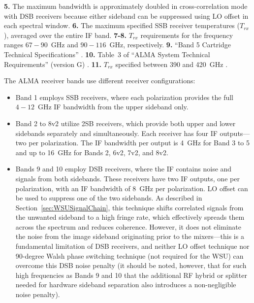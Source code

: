 \begin{table}[h!]
\begin{minipage}{\textwidth}
        \textbf{5.} The maximum bandwidth is approximately doubled in cross-correlation mode with DSB receivers because either sideband can be suppressed using LO offset in each spectral window. 
        \textbf{6.} The maximum specified \ac{SSB} receiver temperatures ($T_{rx}$), averaged over the entire IF band.
        \textbf{7-8.} $T_{rx}$ requirements for the frequency ranges $67-90$~GHz and $90-116$~GHz, respectively.
        \textbf{9.} ``Band 5 Cartridge Technical Specifications'' \cite{band5_spe}.
        \textbf{10.} Table~3 of ``ALMA System Technical Requirements'' (version G) \cite{sys_reqs}.
        \textbf{11.} $T_{rx}$ specified between 390 and 420~GHz \cite{sys_reqs}.
    \end{minipage}
\end{table}

The \ac{ALMA} receiver bands use different receiver configurations:
\begin{itemize}[itemsep=-0.5em]
    \item Band 1 employs \ac{SSB} receivers, where each polarization provides the full $4-12$~GHz IF bandwidth from the upper sideband only.
    \item Band 2 to 8v2 utilize \ac{2SB} receivers, which provide both upper and lower sidebands separately and simultaneously. Each receiver has four IF outputs—two per polarization. The \ac{IF} bandwidth per output is 4~GHz for Band 3 to 5 and up to 16~GHz for Bands 2, 6v2, 7v2, and 8v2.
    \item Bands 9 and 10 employ \ac{DSB} receivers, where the \ac{IF} contains noise and signals from both sidebands. These receivers have two \ac{IF} outputs, one per polarization, with an \ac{IF} bandwidth of 8~GHz per polarization. \ac{LO} offset can be used to suppress one of the two sidebands. As described in Section~\ref{sec:WSUSignalChain}, this technique shifts correlated signals from the unwanted sideband to a high fringe rate, which effectively spreads them across the spectrum and reduces coherence.
    However, it does not eliminate the noise from the image sideband originating prior to the mixers---this is a fundamental limitation of \ac{DSB} receivers, and neither \ac{LO} offset technique nor 90-degree Walsh phase switching technique (not required for the \ac{WSU}) can overcome this \ac{DSB} noise penalty (it should be noted, however, that for such high frequencies as Bands 9 and 10 that the additional RF hybrid or splitter needed for hardware sideband separation also introduces a non-negligible noise penalty).
\end{itemize}



